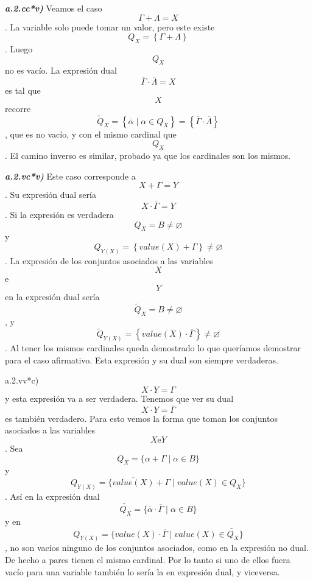 \documentclass[
]{article}
\begin{document}
\begin{enumerate}
\begin{enumerate}
\begin{enumerate}
\begin{enumerate}
\begin{enumerate}
          \emph{\textbf{a.2.cc*v)}} Veamos el caso
          \[{\Gamma + \Lambda} = X\]. La variable solo puede tomar un
          va\-lor, pero este existe
          \[Q_{X} = \left\{ {\Gamma + \Lambda} \right\}\]. Luego
          \[Q_{X}\]no es vacío. La expresión dual
          \[{\overline{\Gamma} \cdot \overline{\Lambda}} = X\]es tal que
          \[X\]recorre
          \[{{\widetilde{Q}}_{X} = \left\{ {\overline{\alpha} \mid {\alpha \in Q_{X}}} \right\}} = \left\{ {\overline{\Gamma} \cdot \overline{\Lambda}} \right\}\],
          que es no vacío, y con el mismo cardinal que \[Q_{X}\]. El
          camino inverso es similar, probado ya que los cardinales son
          los mismos.

          \emph{\textbf{a.2.vc*v)}} Este caso corresponde a
          \[{X + \Gamma} = Y\]. Su expresión dual sería
          \[{X \cdot \overline{\Gamma}} = Y\]. Si la expresión es
          verdadera \[{Q_{X} = B} \neq \varnothing\]y
          \[{Q_{Y{(X)}} = \left\{ {\mathit{value}{{(X)} + \Gamma}} \right\}} \neq \varnothing\].
          La expresión de los conjuntos asociados a las variables \[X\]
          e \[Y\] en la expresión dual sería
          \[{{\widetilde{Q}}_{X} = B} \neq \varnothing\], y
          \[{{\widetilde{Q}}_{Y{(X)}} = \left\{ {{\mathit{value}{(X)}} \cdot \overline{\Gamma}} \right\}} \neq \varnothing\].
          Al tener los mismos cardinales queda demos\-trado lo que
          queríamos demostrar para el caso afirmativo. Esta expresión y
          su dual son siempre verdaderas.

          a.2.vv*c)\[{X \cdot Y} = \Gamma\]y esta expresión va a ser
          verdadera. Tenemos que ver su dual
          \[{X \cdot Y} = \overline{\Gamma}\]es también verdadero. Para
          esto vemos la forma que toman los conjuntos asociados a las
          variables \[X\text{e}Y\]. Sea
          \[Q_{X} = {\{{{\alpha + \Gamma} \mid {\alpha \in B}}\}}\] y
          \[Q_{Y{(X)}} = {\{{{\overline{\mathit{value}{(X)}} + \Gamma} \mid \mathit{value}{{(X)} \in Q_{X}}}\}}\].
          Así en la expresión dual
          \[\widetilde{Q_{X}} = {\{{{\overline{\alpha} \cdot \overline{\Gamma}} \mid {\alpha \in B}}\}}\]
          y en
          \[Q_{Y{(X)}} = {\{{{{\mathit{value}{(X)}} \cdot \overline{\Gamma}} \mid \mathit{value}{{(X)} \in \widetilde{Q_{X}}}}\}}\],
          no son vacíos ninguno de los conjuntos asociados, como en la
          expresión no dual. De hecho a pares tienen el mismo cardinal.
          Por lo tanto si uno de ellos fuera va\-cío para una variable
          también lo sería la en expresión dual, y viceversa.


\end{enumerate}
\end{enumerate}
\end{enumerate}
\end{enumerate}
\end{enumerate}
\end{document}
